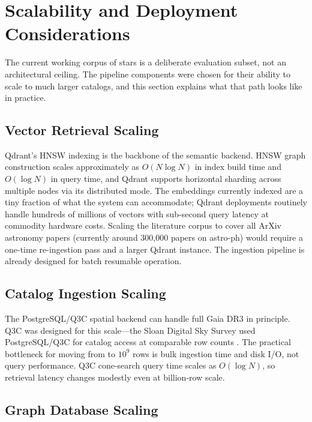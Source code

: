 \documentclass[12pt]{elsarticle}
\begin{document}
\section{Scalability and Deployment Considerations}
\label{sec:scalability}

The current working corpus of \nStarsReal{} stars is a deliberate evaluation subset, not an architectural ceiling. The pipeline components were chosen for their ability to scale to much larger catalogs, and this section explains what that path looks like in practice.

\subsection{Vector Retrieval Scaling}

Qdrant's HNSW indexing \citep{Malkov2020} is the backbone of the semantic backend. HNSW graph construction scales approximately as $O(N \log N)$ in index build time and $O(\log N)$ in query time, and Qdrant supports horizontal sharding across multiple nodes via its distributed mode. The \nPapersQdrant{} embeddings currently indexed are a tiny fraction of what the system can accommodate; Qdrant deployments routinely handle hundreds of millions of vectors with sub-second query latency at commodity hardware costs. Scaling the literature corpus to cover all ArXiv astronomy papers (currently around 300,000 papers on astro-ph) would require a one-time re-ingestion pass and a larger Qdrant instance. The ingestion pipeline is already designed for batch resumable operation.

\subsection{Catalog Ingestion Scaling}

The PostgreSQL/Q3C spatial backend can handle full Gaia DR3 in principle. Q3C was designed for this scale---the Sloan Digital Sky Survey used PostgreSQL/Q3C for catalog access at comparable row counts \citep{York2000}. The practical bottleneck for moving from \nStarsReal{} to $10^9$ rows is bulk ingestion time and disk I/O, not query performance. Q3C cone-search query time scales as $O(\log N)$, so retrieval latency changes modestly even at billion-row scale.

\subsection{Graph Database Scaling}
\end{document}
